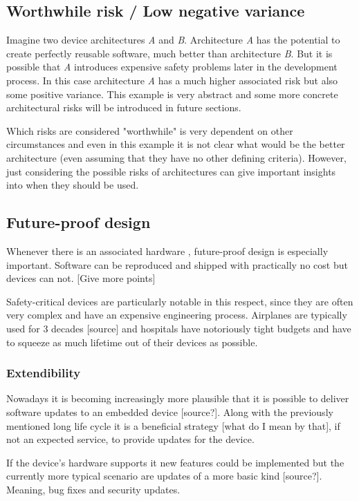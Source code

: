 \subsection{Worthwhile risk / Low negative variance}
Imagine two device architectures \textit{A} and \textit{B}. Architecture \textit{A} has the potential to create perfectly reusable software, much better than architecture \textit{B}. But it is possible that \textit{A} introduces expensive safety problems later in the development process.
In this case architecture \textit{A} has a much higher associated risk but also  some positive variance. This example is very abstract and some more concrete architectural risks will be introduced in future sections. 

Which risks are considered "worthwhile" is very dependent on other circumstances and even in this example it is not clear what would be the better architecture (even assuming that they have no other defining criteria). However, just considering the possible risks of architectures can give important insights into when they should be used.

\subsection{Future-proof design}
Whenever there is an associated hardware , future-proof design is especially important. Software can be reproduced and shipped with practically no cost but devices can not. [Give more points]

Safety-critical devices are particularly notable in this respect, since they are often very complex and have an expensive engineering process. Airplanes are typically used for 3 decades [source] and hospitals have notoriously tight budgets and have to squeeze as much lifetime out of their devices as possible. 
\subsubsection{Extendibility}
Nowadays it is becoming increasingly more plausible that it is possible to deliver software updates to an embedded device [source?]. Along with the previously mentioned long life cycle it is a beneficial strategy [what do I mean by that], if not an expected service, to provide updates for the device.

If the device's hardware supports it new features could be implemented but the currently more typical scenario are updates of a more basic kind [source?]. Meaning, bug fixes and security updates.

